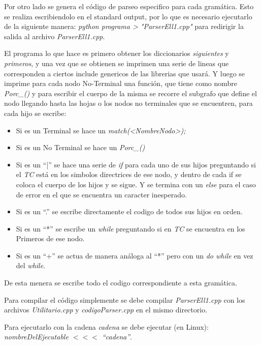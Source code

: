 \documentclass[a4paper]{report}
\begin{document}
Por otro lado se genera el código de parseo especifico para cada gramática. Esto se realiza escribiendolo en el standard output, 
por lo que es necesario ejecutarlo de la siguiente manera: \emph{python programa > "ParserEll1.cpp"} para redirigir la salida al archivo \emph{ParserEll1.cpp}.


El programa lo que hace es primero obtener los diccionarios \emph{siguientes} y \emph{primeros}, y una vez que se obtienen se imprimen una serie de lineas que corresponden a ciertos include genericos de las librerias que usará. Y luego se imprime para cada nodo No-Terminal una función, que tiene como nombre \emph{Porc\_<Nombre Nodo>()} y para escribir el cuerpo de la misma se recorre el subgrafo que define el nodo llegando hasta las hojas o los nodos no terminales que se encuentren, para cada hijo se escribe:


\begin{itemize}
\item Si es un Terminal se hace un \emph{match(<NombreNodo>);}
\item Si es un No Terminal se hace un \emph{Porc\_<Nombre Nodo>()}
\item Si es un ``|'' se hace una serie de \emph{if} para cada uno de sus hijos preguntando si el \emph{TC} está en los simbolos directrices de ese nodo, y dentro de cada if se coloca el cuerpo de los hijos y se sigue. Y se termina con un \emph{else} para el caso de error en el que se encuentra un caracter inesperado.
\item Si es un ``.'' se escribe directamente el codigo de todos sus hijos en orden.
\item Si es un ``*'' se escribe un \emph{while} preguntando si en \emph{TC} se encuentra en los Primeros de ese nodo.
\item Si es un ``+'' se actua de manera análoga al ``*'' pero con un \emph{do while} en vez del \emph{while}.
\end{itemize}


De esta menera se escribe todo el codigo correspondiente a esta gramática.


Para compilar el código simplemente se debe compilar \emph{ParserEll1.cpp} con los archivos \emph{Utilitario.cpp} y \emph{codigoParser.cpp} en el mismo directorio.


Para ejecutarlo con la cadena \emph{cadena} se debe ejecutar (en Linux): \emph{nombreDelEjecutable  $<<<$  ``cadena''}.
\end{document}
